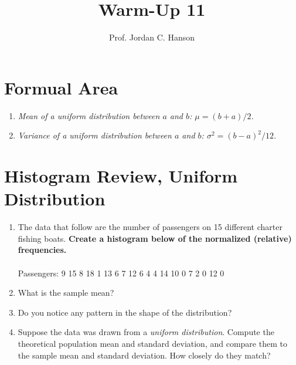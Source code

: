 \documentclass{article}
\begin{document}
\title{Warm-Up 11}
\author{Prof. Jordan C. Hanson}

\maketitle

\section{Formual Area}

\begin{enumerate}
\item \textit{Mean of a uniform distribution between $a$ and $b$: $\mu = (b+a)/2$.}
\item \textit{Variance of a uniform distribution between $a$ and $b$: $\sigma^2 = (b-a)^2/12$.}
\end{enumerate}

\section{Histogram Review, Uniform Distribution}

\begin{enumerate}
\item The data that follow are the number of passengers on 15 different charter fishing boats.  \textbf{Create a histogram below of the normalized (relative) frequencies.} \\ \\
Passengers: 
9 15 8 18 1 13 6 7 12 6 4 4 14 10 0 7 2 0 12 0
\\ \vspace{3cm}
\item What is the sample mean? \\ \vspace{2cm}
\item Do you notice any pattern in the shape of the distribution? \\ \vspace{2cm}
\item Suppose the data was drawn from a \textit{uniform distribution}.  Compute the theoretical population mean and standard deviation, and compare them to the sample mean and standard deviation. How closely do they match?
\end{enumerate}
\end{document}
